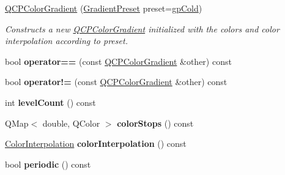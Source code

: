 \begin{DoxyCompactItemize}
\item 
\hyperlink{classQCPColorGradient_a546e44df5fa1846400a582c041361c85}{Q\+C\+P\+Color\+Gradient} (\hyperlink{classQCPColorGradient_aed6569828fee337023670272910c9072}{Gradient\+Preset} preset=\hyperlink{classQCPColorGradient_aed6569828fee337023670272910c9072aec8c001f62c0d5cb853db5fd85309557}{gp\+Cold})
\begin{DoxyCompactList}\small\item\em Constructs a new \hyperlink{classQCPColorGradient}{Q\+C\+P\+Color\+Gradient} initialized with the colors and color interpolation according to {\itshape preset}. \end{DoxyCompactList}\item 
\hypertarget{classQCPColorGradient_aada47d8206bf2cec77462653bf471c13}{}bool {\bfseries operator==} (const \hyperlink{classQCPColorGradient}{Q\+C\+P\+Color\+Gradient} \&other) const \label{classQCPColorGradient_aada47d8206bf2cec77462653bf471c13}

\item 
\hypertarget{classQCPColorGradient_ac641f5d2dc1686201d3cb602c871791d}{}bool {\bfseries operator!=} (const \hyperlink{classQCPColorGradient}{Q\+C\+P\+Color\+Gradient} \&other) const \label{classQCPColorGradient_ac641f5d2dc1686201d3cb602c871791d}

\item 
\hypertarget{classQCPColorGradient_ae7537a8e6d0fed3f1928328062bb0f4e}{}int {\bfseries level\+Count} () const \label{classQCPColorGradient_ae7537a8e6d0fed3f1928328062bb0f4e}

\item 
\hypertarget{classQCPColorGradient_a64f8aba7826f9c6363aacff8376cef37}{}Q\+Map$<$ double, Q\+Color $>$ {\bfseries color\+Stops} () const \label{classQCPColorGradient_a64f8aba7826f9c6363aacff8376cef37}

\item 
\hypertarget{classQCPColorGradient_a731616fabe6f2e33f71f58dd382359d8}{}\hyperlink{classQCPColorGradient_ac5dca17cc24336e6ca176610e7f77fc1}{Color\+Interpolation} {\bfseries color\+Interpolation} () const \label{classQCPColorGradient_a731616fabe6f2e33f71f58dd382359d8}

\item 
\hypertarget{classQCPColorGradient_a860b7048f877195d2a0fb8d5a7cf5d73}{}bool {\bfseries periodic} () const \label{classQCPColorGradient_a860b7048f877195d2a0fb8d5a7cf5d73}


\end{DoxyCompactItemize}
